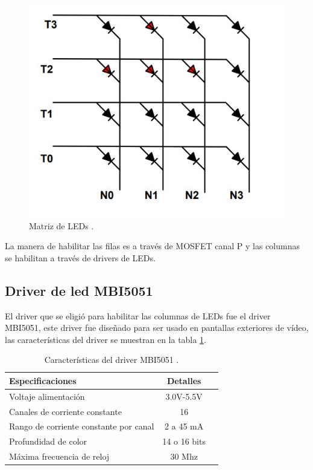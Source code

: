 \begin{figure}[htpb]
	\centering
	\includegraphics[scale=0.5]{Figures/ledmatrix.jpg} 
	\caption{Matriz de LEDs \protect\footnotemark.}
	\label{fig:matrizled}
\end{figure}


La manera de habilitar las filas es a través de MOSFET canal P y las columnas se habilitan a través de drivers de LEDs.
 
 





\subsection{Driver de led MBI5051}
El driver que se eligió para habilitar las columnas de LEDs fue el driver MBI5051, este driver fue diseñado para ser usado en pantallas exteriores de vídeo, las características del driver se muestran en la tabla \ref{tab:driverled}.

\begin{table}[h]
\centering
\caption[Características MBI5051]{Características del driver MBI5051 \protect\footnotemark.}
\begin{tabular}{l c c}
\toprule
\textbf{Especificaciones}& \textbf{Detalles}\\
\midrule 

Voltaje alimentación & 3.0V-5.5V\\
Canales de corriente constante & 16\\
Rango de corriente constante por canal & 2 a 45 mA\\
Profundidad de color & 14 o 16 bits\\
Máxima frecuencia de reloj & 30 Mhz\\

\bottomrule
\hline
\end{tabular}
\label{tab:driverled}
\end{table}

